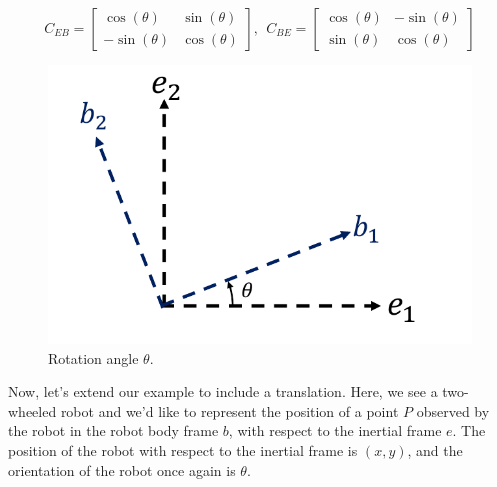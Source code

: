 \begin{equation}
C_{EB} = 
\begin{bmatrix}
 \cos(\theta) & \sin(\theta) \\
 -\sin(\theta) & \cos(\theta) 
\end{bmatrix}, ~~
C_{BE} =
\begin{bmatrix}
 \cos(\theta) & -\sin(\theta) \\
 \sin(\theta) & \cos(\theta)
\end{bmatrix} 
\end{equation}

\begin{figure}[!htb]
\begin{center}
\includegraphics[scale=0.290]{img/coordinate_transforms/theta_angle.jpeg}
\end{center}
\caption{Rotation angle $\theta$.}
\label{theta_angle}
\end{figure}


Now, let's extend our example to include a translation. Here, we see a two-wheeled robot and we'd like to represent the position of a point $P$ 
observed by the robot in the robot body frame $b$, with respect to the inertial frame $e$. 
The position of the robot with respect to the inertial frame is $(x, y)$, and the orientation of the robot once again is $\theta$.


